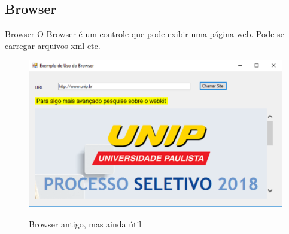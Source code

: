 

		\subsection{Browser}


	\begin{frame}
		
		\begin{CaixaModelo01}{Browser}
					O Browser é um controle que pode exibir uma página web.
			Pode-se carregar arquivos xml etc.
			
			\begin{figure}\textbf{}
				\includegraphics[scale=.45]{./Figuras/F04_Browser.png}
				\caption{Browser antigo, mas ainda útil}
				\label{fig:Browser}
			\end{figure}			

		\end{CaixaModelo01}
	
	\end{frame}


